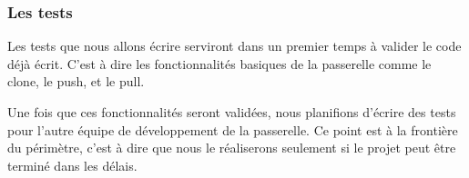 \documentclass[11pt]{article}
\begin{document}
\subsubsection{Les tests}
Les tests que nous allons écrire serviront dans un premier temps à valider le code déjà écrit. C'est à dire les fonctionnalités basiques de la passerelle comme le clone, le push, et le pull.

Une fois que ces fonctionnalités seront validées, nous planifions d'écrire des tests pour l'autre équipe de développement de la passerelle. Ce point est à la frontière du périmètre, c'est à dire que nous le réaliserons seulement si le projet peut être terminé dans les délais.
\end{document}
